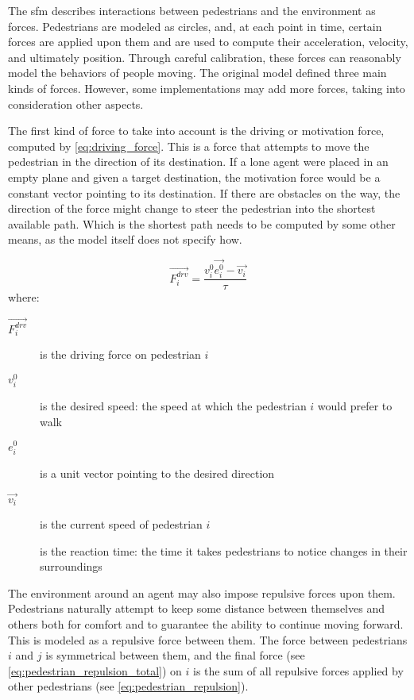 \documentclass[twoside, 11pt]{article}
\begin{document}
The \gls{sfm} describes interactions between pedestrians and the environment as forces. Pedestrians are modeled as circles, and, at each point in time, certain forces are applied upon them and are used to compute their acceleration, velocity, and ultimately position. Through careful calibration, these forces can reasonably model the behaviors of people moving. The original model defined three main kinds of forces. However, some implementations may add more forces, taking into consideration other aspects.

The first kind of force to take into account is the driving or motivation force, computed by \autoref{eq:driving_force}. This is a force that attempts to move the pedestrian in the direction of its destination. If a lone agent were placed in an empty plane and given a target destination, the motivation force would be a constant vector pointing to its destination. If there are obstacles on the way, the direction of the force might change to steer the pedestrian into the shortest available path. Which is the shortest path needs to be computed by some other means, as the model itself does not specify how.

\begin{equation}
  \vec{F_i^{drv}} = \frac{v_i^0 \vec{e_i^0} - \vec{v_i}}{\tau}
  \label{eq:driving_force}
\end{equation}
where:
\begin{description}
  \item[$\vec{F_i^{drv}}$] is the driving force on pedestrian $i$
  \item[$v_i^0$] is the desired speed: the speed at which the pedestrian $i$ would prefer to walk
  \item[$e_i^0$] is a unit vector pointing to the desired direction
  \item[$\vec{v_i}$] is the current speed of pedestrian $i$
  \item[\tau] is the reaction time: the time it takes pedestrians to notice changes in their surroundings 
\end{description}

The environment around an agent may also impose repulsive forces upon them. Pedestrians naturally attempt to keep some distance between themselves and others both for comfort and to guarantee the ability to continue moving forward. This is modeled as a repulsive force between them. The force between pedestrians $i$ and $j$ is symmetrical between them, and the final force (see \autoref{eq:pedestrian_repulsion_total}) on $i$ is the sum of all repulsive forces applied by other pedestrians (see \autoref{eq:pedestrian_repulsion}).
\end{document}
